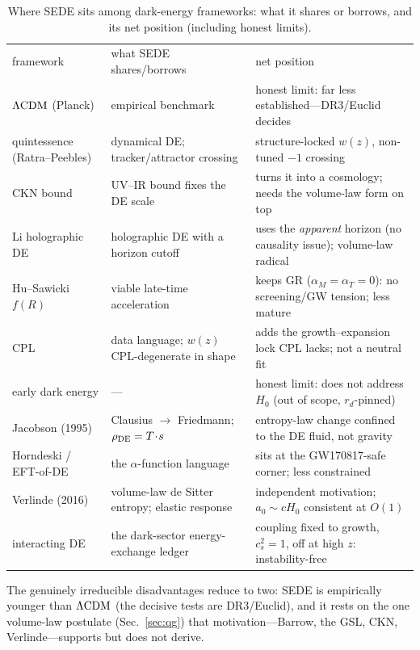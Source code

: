 \begin{table}[t]
\caption{Where SEDE sits among dark-energy frameworks: what it shares or borrows, and its net
position (including honest limits).}\label{tab:frameworks}
\begin{ruledtabular}
\footnotesize
\begin{tabular}{@{}p{}p{}p{}@{}}
framework & what SEDE shares/borrows & net position \\ \colrule
$\Lambda\mathrm{CDM}$ (Planck) & empirical benchmark & honest limit: far less established---DR3/Euclid decides \\
quintessence (Ratra--Peebles) & dynamical DE; tracker/attractor crossing & structure-locked $w(z)$, non-tuned $-1$ crossing \\
CKN bound & UV--IR bound fixes the DE scale & turns it into a cosmology; needs the volume-law form on top \\
Li holographic DE & holographic DE with a horizon cutoff & uses the \emph{apparent} horizon (no causality issue); volume-law radical \\
Hu--Sawicki $f(R)$ & viable late-time acceleration & keeps GR ($\alpha_M{=}\alpha_T{=}0$): no screening/GW tension; less mature \\
CPL & data language; $w(z)$ CPL-degenerate in shape & adds the growth--expansion lock CPL lacks; not a neutral fit \\
early dark energy & --- & honest limit: does not address $H_0$ (out of scope, $r_d$-pinned) \\
Jacobson (1995) & Clausius $\to$ Friedmann; $\rho_{\mathrm{DE}}=T\!\cdot\!s$ & entropy-law change confined to the DE fluid, not gravity \\
Horndeski / EFT-of-DE & the $\alpha$-function language & sits at the GW170817-safe corner; less constrained \\
Verlinde (2016) & volume-law de Sitter entropy; elastic response & independent motivation; $a_0\sim cH_0$ consistent at $O(1)$ \\
interacting DE & the dark-sector energy-exchange ledger & coupling fixed to growth, $c_s^2{=}1$, off at high $z$: instability-free \\
\end{tabular}
\end{ruledtabular}
\end{table}

The genuinely irreducible disadvantages reduce to two: SEDE is empirically younger than $\Lambda\mathrm{CDM}$ (the
decisive tests are DR3/Euclid), and it rests on the one volume-law postulate (Sec.~\ref{sec:qg}) that
motivation---Barrow, the GSL, CKN, Verlinde---supports but does not derive.

